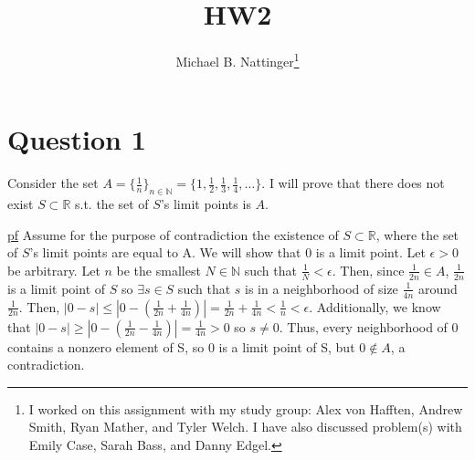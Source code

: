 \documentclass[11pt]{article} %
\title{HW2}
\author{Michael B. Nattinger\footnote{I worked on this assignment with my study group: Alex von Hafften, Andrew Smith, Ryan Mather, and Tyler Welch. I have also discussed problem(s) with Emily Case, Sarah Bass, and Danny Edgel.}}
\begin{document}
	\maketitle
	
	\section{Question 1}
	Consider the set $A = \{ \frac{1}{n} \}_{n \in \mathbb{N}} = \{1, \frac{1}{2}, \frac{1}{3}, \frac{1}{4}, \dots \}.$ I will prove that there does not exist $S \subset \mathbb{R}$ s.t. the set of $S$'s limit points is $A$.
	
	\underline{pf} Assume for the purpose of contradiction the existence of $S \subset \mathbb{R}$, where the set of $S$'s limit points are equal to A. We will show that 0 is a limit point. Let $\epsilon > 0$ be arbitrary. Let $n$ be the smallest $N \in \mathbb{N}$ such that $\frac{1}{N}< \epsilon.$ Then, since $\frac{1}{2n} \in A$, $\frac{1}{2n}$ is a limit point of $S$ so $\exists s \in S$ such that $s$ is in a neighborhood of size $\frac{1}{4n}$ around $\frac{1}{2n}$. Then, $|0 - s| \leq |0 - \left( \frac{1}{2n} + \frac{1}{4n} \right)| = \frac{1}{2n} + \frac{1}{4n} < \frac{1}{n}< \epsilon$. Additionally, we know that $|0 - s| \geq |0 - \left( \frac{1}{2n} - \frac{1}{4n}\right)| = \frac{1}{4n} > 0$ so $s \neq 0$. Thus, every neighborhood of 0 contains a nonzero element of S, so 0 is a limit point of S, but $0 \notin A$, a contradiction.
\end{document}
